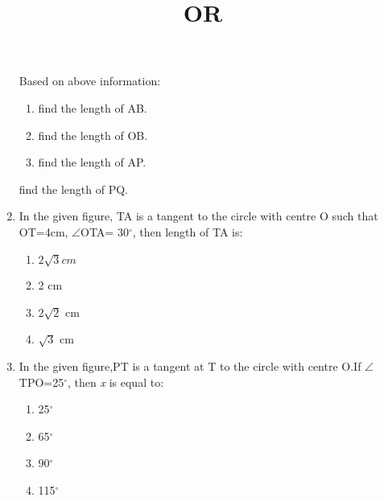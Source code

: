 \documentclass[12pt,A4 paper]{article}
\begin{document}
\begin{flushleft}
\begin{enumerate}
     
Based on above information:

           \begin{enumerate}
             \item find the length of AB.
             \item find the length of OB.
             \item find the length of AP.
         \end{enumerate}
\begin{center}
\title{OR}
\end{center}
find the length of PQ.
\item In the given figure, TA is a tangent to the circle with centre O such that OT=4cm, $\angle$OTA= 30$^{\circ}$, then length of TA is:
      \begin{enumerate}
          \item $2\sqrt3 cm$
          \item 2 cm
          \item $2\sqrt2$ cm
          \item $\sqrt3$ cm
      \end{enumerate}
        \begin{flushright}
        \end{flushright}
\item In the given figure,PT is a tangent at T to the circle with centre O.If $\angle$TPO=25$^{\circ}$, then \textit{x} is equal to:
   \begin{enumerate}
       \item 25$^{\circ}$
       \item 65$^{\circ}$  
       \item 90$^{\circ}$
       \item 115$^{\circ}$
       
   \end{enumerate}
    \begin{flushright}
\end{flushright}
\end{enumerate}
\end{flushleft}
\end{document}
